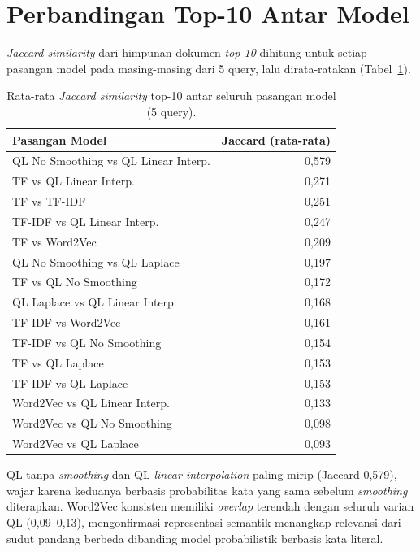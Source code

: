 \documentclass[10pt,a4paper]{article}
\begin{document}
\section{Perbandingan Top-10 Antar Model}

\emph{Jaccard similarity} dari himpunan dokumen \emph{top-10} dihitung untuk setiap pasangan model pada masing-masing dari 5 query, lalu dirata-ratakan (Tabel~\ref{tab:jaccard}).

\begin{table}[h]
    \centering
    \small
    \begin{tabular}{lr}
        \toprule
        \textbf{Pasangan Model} & \textbf{Jaccard (rata-rata)} \\
        \midrule
        QL No Smoothing vs QL Linear Interp. & 0,579 \\
        TF vs QL Linear Interp.              & 0,271 \\
        TF vs TF-IDF                         & 0,251 \\
        TF-IDF vs QL Linear Interp.          & 0,247 \\
        TF vs Word2Vec                       & 0,209 \\
        QL No Smoothing vs QL Laplace        & 0,197 \\
        TF vs QL No Smoothing                & 0,172 \\
        QL Laplace vs QL Linear Interp.      & 0,168 \\
        TF-IDF vs Word2Vec                   & 0,161 \\
        TF-IDF vs QL No Smoothing            & 0,154 \\
        TF vs QL Laplace                     & 0,153 \\
        TF-IDF vs QL Laplace                 & 0,153 \\
        Word2Vec vs QL Linear Interp.         & 0,133 \\
        Word2Vec vs QL No Smoothing          & 0,098 \\
        Word2Vec vs QL Laplace               & 0,093 \\
        \bottomrule
    \end{tabular}
    \caption{Rata-rata \emph{Jaccard similarity} top-10 antar seluruh pasangan model (5 query).}
    \label{tab:jaccard}
\end{table}

QL tanpa \emph{smoothing} dan QL \emph{linear interpolation} paling mirip (Jaccard 0,579), wajar karena keduanya berbasis probabilitas kata yang sama sebelum \emph{smoothing} diterapkan. Word2Vec konsisten memiliki \emph{overlap} terendah dengan seluruh varian QL (0,09--0,13), mengonfirmasi representasi semantik menangkap relevansi dari sudut pandang berbeda dibanding model probabilistik berbasis kata literal.
\end{document}
